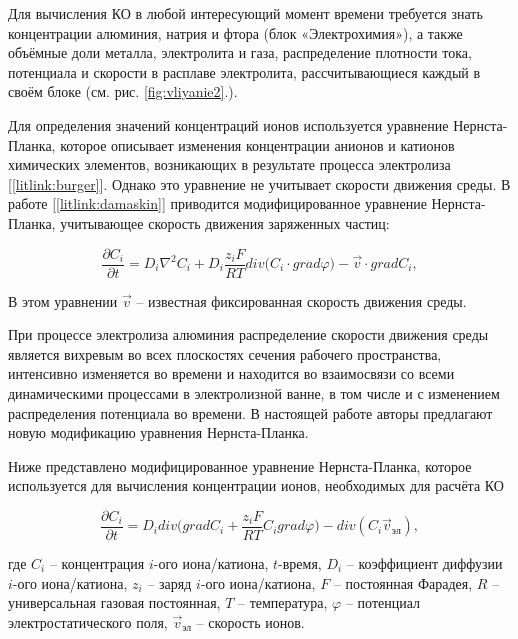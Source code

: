 \documentclass[]{pmi}
\def\phi{\varphi}
\begin{document}
Для вычисления КО в любой интересующий момент времени требуется знать концентрации алюминия, натрия и фтора (блок «Электрохимия»), а также объёмные доли металла, электролита и газа, распределение плотности тока, потенциала и скорости в расплаве электролита, рассчитывающиеся каждый в своём блоке (см. рис. \ref{fig:vliyanie2}.). 

Для определения значений концентраций ионов используется уравнение Нернста-Планка, которое описывает изменения концентрации анионов и катионов химических элементов, возникающих в результате процесса электролиза [\ref{litlink:burger}]. Однако это уравнение не учитывает скорости движения среды. В работе [\ref{litlink:damaskin}] приводится модифицированное уравнение Нернста-Планка, учитывающее скорость движения заряженных частиц:

\begin{equation}\label{eq:NPeq}
\frac{\partial C_i}{\partial t} = D_i\nabla^{2}C_i+D_i\frac{z_iF}{RT}div\big(C_i \cdot grad\phi\big) - \overrightarrow{v} \cdot gradC_i,
\end{equation}

В этом уравнении $\overrightarrow{v}$ – известная фиксированная скорость движения среды. 

При процессе электролиза алюминия распределение скорости движения среды является вихревым во всех плоскостях сечения рабочего пространства, интенсивно изменяется во времени и находится во взаимосвязи со всеми динамическими процессами в электролизной ванне, в том числе и с изменением распределения потенциала во времени. В настоящей работе авторы предлагают новую модификацию уравнения Нернста-Планка.


Ниже представлено модифицированное уравнение Нернста-Планка, которое используется для вычисления концентрации ионов, необходимых для расчёта КО

\begin{equation}\label{eq:NPeqmod}
\frac{\partial C_i}{\partial t} = D_idiv\bigg(gradC_i + \frac{z_iF}{RT}C_igrad\phi\bigg) - div(C_i \overrightarrow{v}_{\text{эл}}),
\end{equation}

где $C_i$ – концентрация $i$-ого иона/катиона, $t$-время, $D_i$ – коэффициент диффузии $i$-ого иона/катиона, $z_i$ – заряд $i$-ого иона/катиона, $F$ – постоянная Фарадея, $R$ – универсальная газовая постоянная, $T$ – температура, $\phi$ – потенциал электростатического поля, $\overrightarrow{v}_\text{эл}$ – скорость ионов.
\end{document}
